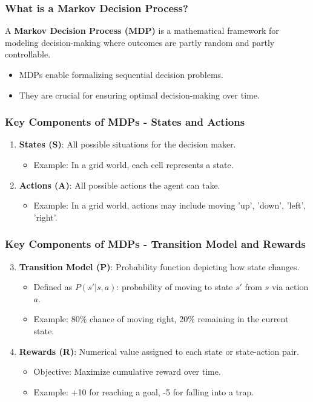 \documentclass[aspectratio=169]{beamer}
\begin{document}
\begin{frame}[fragile]
    \frametitle{What is a Markov Decision Process?}
    A \textbf{Markov Decision Process (MDP)} is a mathematical framework for modeling decision-making where outcomes are partly random and partly controllable. 
    \begin{itemize}
        \item MDPs enable formalizing sequential decision problems.
        \item They are crucial for ensuring optimal decision-making over time.
    \end{itemize}
\end{frame}

\begin{frame}[fragile]
    \frametitle{Key Components of MDPs - States and Actions}
    \begin{enumerate}
        \item \textbf{States (S)}: All possible situations for the decision maker.
        \begin{itemize}
            \item Example: In a grid world, each cell represents a state.
        \end{itemize}

        \item \textbf{Actions (A)}: All possible actions the agent can take.
        \begin{itemize}
            \item Example: In a grid world, actions may include moving 'up', 'down', 'left', 'right'.
        \end{itemize}

    \end{enumerate}
\end{frame}

\begin{frame}[fragile]
    \frametitle{Key Components of MDPs - Transition Model and Rewards}
    \begin{enumerate}
        \setcounter{enumi}{2}
        \item \textbf{Transition Model (P)}: Probability function depicting how state changes.
        \begin{itemize}
            \item Defined as $P(s' | s, a)$: probability of moving to state $s'$ from $s$ via action $a$.
            \item Example: 80\% chance of moving right, 20\% remaining in the current state.
        \end{itemize}

        \item \textbf{Rewards (R)}: Numerical value assigned to each state or state-action pair.
        \begin{itemize}
            \item Objective: Maximize cumulative reward over time.
            \item Example: +10 for reaching a goal, -5 for falling into a trap.
        \end{itemize}
    \end{enumerate}
\end{frame}
\end{document}
